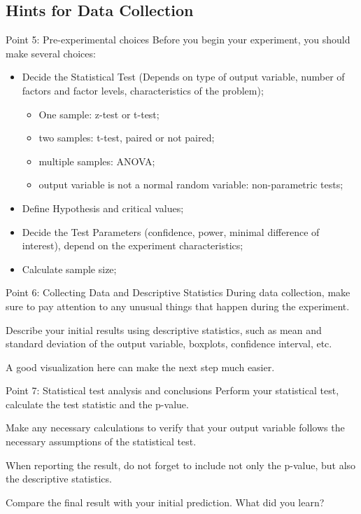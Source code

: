 \subsection{Hints for Data Collection}

\begin{frame}{Point 5: Pre-experimental choices}
  Before you begin your experiment, you should make several choices:\bigskip

  \begin{itemize}
    \item Decide the Statistical Test (Depends on type of output variable, number of factors and factor levels, characteristics of the problem);
    \begin{itemize}
      \item One sample: z-test or t-test;
      \item two samples: t-test, paired or not paired;
      \item multiple samples: ANOVA;
      \item output variable is not a normal random variable: non-parametric tests;
    \end{itemize}
    \item Define Hypothesis and critical values;
    \item Decide the Test Parameters (confidence, power, minimal difference of interest), depend on the experiment characteristics;
    \item Calculate sample size;
  \end{itemize}
\end{frame}

\begin{frame}{Point 6: Collecting Data and Descriptive Statistics}
  During data collection, make sure to pay attention to any unusual things that happen during the experiment.\bigskip

  Describe your initial results using descriptive statistics, such as mean and standard deviation of the output variable, boxplots, confidence interval, etc.\bigskip

  A good visualization here can make the next step much easier.
\end{frame}

\begin{frame}{Point 7: Statistical test analysis and conclusions}
  Perform your statistical test, calculate the test statistic and the p-value.\bigskip

  Make any necessary calculations to verify that your output variable follows the necessary assumptions of the statistical test.\bigskip

  When reporting the result, do not forget to include not only the p-value, but also the descriptive statistics.\bigskip

  Compare the final result with your initial prediction. What did you learn?
\end{frame}

%
